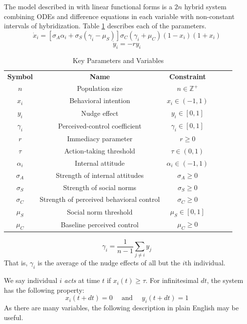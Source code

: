 \documentclass[preprint,12pt]{elsarticle}
\newcommand{\Z}{{\mathbb Z}}
\begin{document}
The model described in \cite{schwarze2024planned} with linear functional forms is a $2n$ hybrid system combining ODEs and difference equations in each variable with non-constant intervals of hybridization. Table \ref{tab:KeyParemetersandVariables} describes each of the parameters. 
\[
\dot x_i = [\sigma_A \alpha_i + \sigma_S(\gamma_i - \mu_S)]\sigma_C (\gamma_i + \mu_C)(1-x_i)(1+x_i)
\]
\[\dot y_i = -ry_i\]
\begin{table}[h]
    \begin{center}
    \begin{tabular}{cccccc}
        \textbf{Symbol} & \textbf{Name} & \textbf{Constraint}\\
        $n$ & Population size & $n \in \Z^+$ \\
        $x_i$ & Behavioral intention & $x_i \in (-1,1)$ \\
        $y_i$ & Nudge effect & $y_i \in [0,1]$ \\
        $\gamma_i$ & Perceived-control coefficient & $\gamma_i \in [0,1]$ \\
        $r$ & Immediacy parameter & $r \geq 0$ \\
        $\tau$ & Action-taking threshold & $\tau \in (0,1) $\\
        $\alpha_i$ & Internal attitude & $\alpha_i \in (-1,1)$ \\
        $\sigma_A$ & Strength of internal attitudes & $\sigma_A \geq 0$ \\
        $\sigma_S$ & Strength of social norms & $\sigma_S \geq 0$ \\
        $\sigma_C$ & Strength of perceived behavioral control & $\sigma_C \geq 0$ \\
        $\mu_S$ & Social norm threshold & $\mu_S \in [0,1]$ \\
        $\mu_C$ & Baseline perceived control & $\mu_ C\geq 0$ \\
    \end{tabular}
    \caption{Key Parameters and Variables}
    \label{tab:KeyParemetersandVariables}
    \end{center}
\end{table}
\[\gamma_i = \frac{1}{n-1}\sum_{j \neq i}y_j\]
That is, $\gamma_i$ is the average of the nudge effects of all but the $i$th individual.

We say individual $i$ \textit{acts} at time $t$ if $x_i(t) \geq \tau$. For infinitesimal $dt$, the system has the following property:
\[x_i(t + dt) = 0 \quad \text{ and } \quad y_i(t + dt) = 1 \]
As there are many variables, the following description in plain English may be useful.
\end{document}
